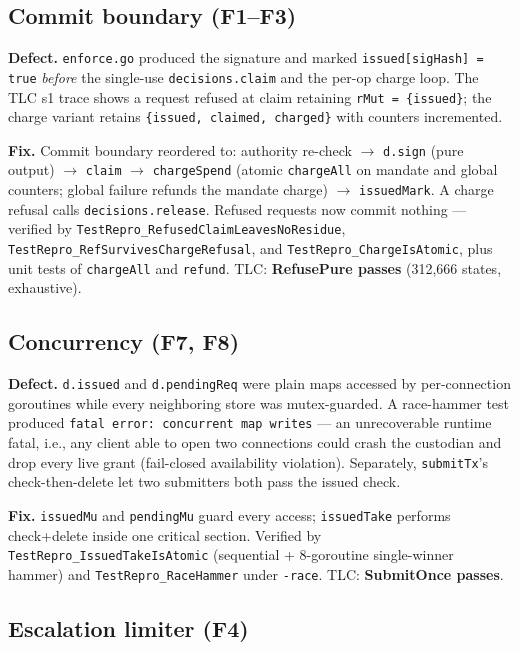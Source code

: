\documentclass[11pt]{article}
\newcommand{\code}[1]{\texttt{#1}}
\newcommand{\file}[1]{\texttt{#1}}
\begin{document}
\subsection{Commit boundary (F1--F3)}

\textbf{Defect.} \file{enforce.go} produced the signature and marked
\code{issued[sigHash] = true} \emph{before} the single-use
\code{decisions.claim} and the per-op charge loop. The TLC s1 trace shows a
request refused at claim retaining \code{rMut = \{issued\}}; the charge variant
retains \code{\{issued, claimed, charged\}} with counters incremented.

\textbf{Fix.} Commit boundary reordered to: authority re-check $\to$
\code{d.sign} (pure output) $\to$ \code{claim} $\to$ \code{chargeSpend}
(atomic \code{chargeAll} on mandate and global counters; global failure
refunds the mandate charge) $\to$ \code{issuedMark}. A charge refusal calls
\code{decisions.release}. Refused requests now commit nothing — verified by
\code{TestRepro\_RefusedClaimLeavesNoResidue},
\code{TestRepro\_RefSurvivesChargeRefusal}, and
\code{TestRepro\_ChargeIsAtomic}, plus unit tests of \code{chargeAll} and
\code{refund}.
TLC: \textbf{RefusePure passes} (312{,}666 states, exhaustive).

\subsection{Concurrency (F7, F8)}

\textbf{Defect.} \code{d.issued} and \code{d.pendingReq} were plain maps
accessed by per-connection goroutines while every neighboring store was
mutex-guarded. A race-hammer test produced
\code{fatal error: concurrent map writes} — an unrecoverable runtime fatal,
i.e., any client able to open two connections could crash the custodian and
drop every live grant (fail-closed availability violation). Separately,
\code{submitTx}'s check-then-delete let two submitters both pass the issued
check.

\textbf{Fix.} \code{issuedMu} and \code{pendingMu} guard every access;
\code{issuedTake} performs check+delete inside one critical section.
Verified by \code{TestRepro\_IssuedTakeIsAtomic} (sequential + 8-goroutine
single-winner hammer) and \code{TestRepro\_RaceHammer} under \code{-race}.
TLC: \textbf{SubmitOnce passes}.

\subsection{Escalation limiter (F4)}
\end{document}
